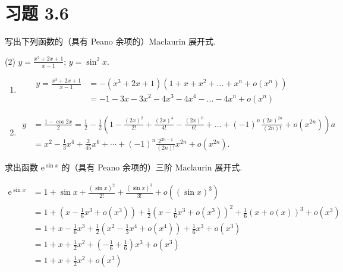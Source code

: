 \section{习题 3.6}

\begin{exercise}[3.6.1]
    写出下列函数的（具有 Peano 余项的）Maclaurin 展开式.
    \begin{tasks}(2)
        \task $y = \frac{x^3 + 2x + 1}{x - 1}$;
        \task $y = \sin^2 x$.
    \end{tasks}
\end{exercise}

\begin{solution}
    \begin{enumerate}
        \item \begin{align*}
                  y = \frac{x^3 + 2x + 1}{x - 1} & = -(x^3 + 2x + 1)(1 + x + x^2 + \dots + x^n + o(x^n))  \\
                                                 & = -1 - 3x - 3x^2 - 4x^3 - 4x^4 - \dots - 4x^n + o(x^n)
              \end{align*}
        \item \begin{align*}
                  y & = \frac{1-\cos 2x}{2} = \frac{1}{2} - \frac{1}{2}\left(1 - \frac{(2x)^2}{2!} + \frac{(2x)^4}{4!} - \frac{(2x)^6}{6!} + \dots + (-1)^n \frac{(2x)^{2n}}{(2n)!} + o(x^{2n})\right) a \\
                    & = x^2 - \frac{1}{3}x^4 + \frac{2}{45}x^6 + \cdots + (-1)^n \frac{2^{2n-1}}{(2n)!} x^{2n} + o(x^{2n}).
              \end{align*}
    \end{enumerate}
\end{solution}

\begin{exercise}[3.6.2]
    求出函数 $\mathrm{e}^{\sin x}$ 的（具有 Peano 余项的）三阶 Maclaurin 展开式.
\end{exercise}

\begin{solution}
    \begin{align*}
        \mathrm{e}^{\sin x} & = 1 + \sin x + \frac{(\sin x)^2}{2!} + \frac{(\sin x)^3}{3!} + o((\sin x)^3)                                                                         \\
                            & = 1 + \left(x - \frac{1}{6}x^3 + o(x^3)\right) + \frac{1}{2}\left(x - \frac{1}{6}x^3 + o(x^3)\right)^2 + \frac{1}{6}\left(x + o(x)\right)^3 + o(x^3) \\
                            & = 1 + x - \frac{1}{6}x^3 + \frac{1}{2}\left(x^2 - \frac{1}{3}x^4 + o(x^4)\right) + \frac{1}{6}x^3 + o(x^3)                                           \\
                            & = 1 + x + \frac{1}{2}x^2 + \left(-\frac{1}{6} + \frac{1}{6}\right)x^3 + o(x^3)                                                                       \\
                            & = 1 + x + \frac{1}{2}x^2 + o(x^3)
    \end{align*}
\end{solution}

